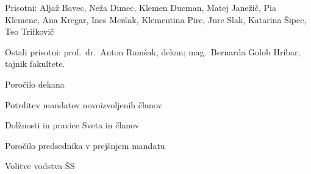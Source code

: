 \documentclass{seja}
\begin{document}
Prisotni:
Aljaž Bavec,
Neža Dimec,
Klemen Ducman,
Matej Janežič,
Pia Klemenc,
Ana Kregar,
Ines Meršak,
Klementina Pirc,
Jure Slak,
Katarina Šipec,
Teo Trifkovič

Ostali prisotni: prof.~dr.~Anton Ramšak, dekan; mag.~Bernarda Golob Hribar, tajnik fakultete.

\begin{red*}
  \item Poročilo dekana
  \item Potrditev mandatov novoizvoljenih članov
  \item Dolžnosti in pravice Sveta in članov
  \item Poročilo predsednika v prejšnjem mandatu
  \item Volitve vodstva ŠS
\end{red*}
\end{document}
